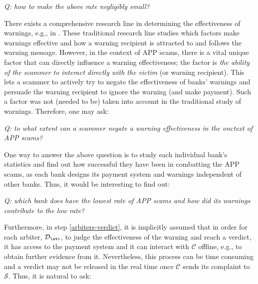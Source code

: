 
  \begin{center}\textit{Q: how to make the above rate negligibly small?}
  \end{center}



There exists  a comprehensive research line in determining the effectiveness of warnings, e.g., in \cite{laughery2006designing,brinton2016users,felt2014experimenting}. These traditional research line  studies which factors make warnings effective and how a warning recipient is attracted to and follows the warning message.  However, in the context of APP scams, there is a vital  unique factor  that can directly influence a warning effectiveness; the factor is    \emph{the ability of the scammer to interact directly with the victim} (or warning recipient). This lets a scammer to actively try to negate  the effectiveness of banks' warnings and persuade the warning recipient to ignore the warning (and make  payment). Such a factor was not (needed to be) taken into account in the traditional study of warnings. Therefore, one may ask: 

  \begin{center}\textit{Q: to what extent can a scammer  negate a warning effectiveness in the onctext of APP scams?}
  \end{center}


One way to answer the above question is to study each individual bank's statistics and find out how successful they have been in combatting the APP scams, as each bank designs its payment system and warnings independent of other banks. Thus, it would be interesting to find out:
  \begin{center}\textit{Q: which bank  does have  the  lowest rate of APP scams and how did its warnings contribute to the low rate?}  
  \end{center}


Furthermore, in step \ref{arbiters-verdict}, it is implicitly assumed that in order for each arbiter, $\mathcal{D}_{\st i}$, to judge  the effectiveness of the warning and reach a verdict, it has access to the payment system and it can interact  with  $\mathcal{C}$ offline, e.g., to obtain further evidence from it.  Nevertheless, this process can be time consuming and a verdict may not be released in the real time once $\mathcal{C}$ sends its complaint to $\mathcal{S}$. Thus, it is natural to ask: 

